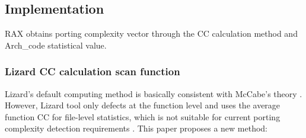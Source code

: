 \documentclass[sigconf,screen,review,anonymous]{acmart}
\begin{document}

\subsection{Implementation}
\label{sec:Implementation}
RAX obtains porting complexity vector through the CC calculation method and Arch\_code statistical value.

\subsubsection{Lizard CC calculation scan function}
Lizard's default computing method is basically consistent with McCabe's theory \cite{1702388}.
However, Lizard tool only defects at the function level and uses the average function CC for file-level statistics, which is not suitable for current porting complexity detection requirements \cite{9402593}.
This paper proposes a new method:
\end{document}
